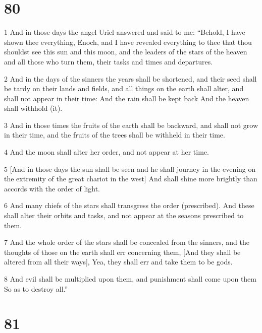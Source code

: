 \chapter{80}

\par 1 And in those days the angel Uriel answered and said to me: “Behold, I have shown thee everything, Enoch, and I have revealed everything to thee that thou shouldst see this sun and this moon, and the leaders of the stars of the heaven and all those who turn them, their tasks and times and departures.
\par 2 And in the days of the sinners the years shall be shortened, and their seed shall be tardy on their lands and fields, and all things on the earth shall alter, and shall not appear in their time: And the rain shall be kept back And the heaven shall withhold (it).
\par 3 And in those times the fruits of the earth shall be backward, and shall not grow in their time, and the fruits of the trees shall be withheld in their time.
\par 4 And the moon shall alter her order, and not appear at her time.
\par 5 [And in those days the sun shall be seen and he shall journey in the evening on the extremity of the great chariot in the west] And shall shine more brightly than accords with the order of light.
\par 6 And many chiefs of the stars shall transgress the order (prescribed). And these shall alter their orbits and tasks, and not appear at the seasons prescribed to them.
\par 7 And the whole order of the stars shall be concealed from the sinners, and the thoughts of those on the earth shall err concerning them, [And they shall be altered from all their ways], Yea, they shall err and take them to be gods.
\par 8 And evil shall be multiplied upon them, and punishment shall come upon them So as to destroy all.”

\chapter{81}


